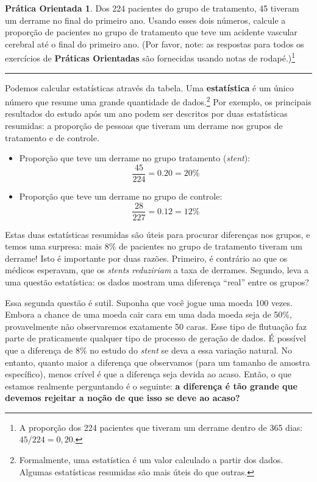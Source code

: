 \documentclass[
]{book}
\theoremstyle{definition}
\theoremstyle{definition}
\theoremstyle{definition}
\newtheorem{exercise}{Prática Orientada}[chapter]
\theoremstyle{definition}
\theoremstyle{remark}
\begin{document}
\begin{exercise}
\protect\hypertarget{exr:unnamed-chunk-2}{}{\label{exr:unnamed-chunk-2} }Dos 224 pacientes do grupo de tratamento, 45 tiveram um derrame no final do primeiro ano. Usando esses dois números, calcule a proporção de pacientes no grupo de tratamento que teve um acidente vascular cerebral até o final do primeiro ano. (Por favor, note: as respostas para todos os exercícios de \textbf{Práticas Orientadas} são fornecidas usando notas de rodapé.)\footnote{A proporção dos 224 pacientes que tiveram um derrame dentro de 365 dias: \(45/224 = 0,20\).}
\end{exercise}

\begin{center}\rule{0.5\linewidth}{0.5pt}\end{center}

Podemos calcular estatísticas através da tabela. Uma \textbf{estatística} é um único número que resume uma grande quantidade de dados.\footnote{Formalmente, uma estatística é um valor calculado a partir dos dados. Algumas estatísticas resumidas são mais úteis do que outras.} Por exemplo, os principais resultados do estudo após um ano podem ser descritos por duas estatísticas resumidas: a proporção de pessoas que tiveram um derrame nos grupos de tratamento e de controle.

\begin{itemize}
\item
  Proporção que teve um derrame no grupo tratamento (\emph{stent}):
  \[\frac{45}{224} = 0.20 = 20\%\]
\item
  Proporção que teve um derrame no grupo de controle:
  \[\frac{28}{227} = 0.12 = 12\%\]
\end{itemize}

Estas duas estatísticas resumidas são úteis para procurar diferenças nos grupos, e temos uma surpresa: mais 8\% de pacientes no grupo de tratamento tiveram um derrame! Isto é importante por duas razões. Primeiro, é contrário ao que os médicos esperavam, que os \emph{stents} \emph{reduziriam} a taxa de derrames. Segundo, leva a uma questão estatística: os dados mostram uma diferença ``real'' entre os grupos?

Essa segunda questão é sutil. Suponha que você jogue uma moeda 100 vezes. Embora a chance de uma moeda cair cara em uma dada moeda seja de 50\%, provavelmente não observaremos exatamente 50 caras. Esse tipo de flutuação faz parte de praticamente qualquer tipo de processo de geração de dados. É possível que a diferença de 8\% no estudo do \emph{stent} se deva a essa variação natural. No entanto, quanto maior a diferença que observamos (para um tamanho de amostra específico), menos crível é que a diferença seja devida ao acaso. Então, o que estamos realmente perguntando é o seguinte: \textbf{a diferença é tão grande que devemos rejeitar a noção de que isso se deve ao acaso?}
\end{document}
